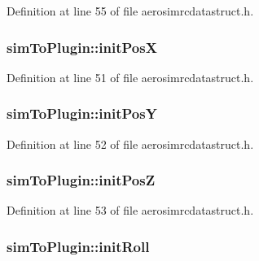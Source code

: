 Definition at line 55 of file aerosimrcdatastruct.\-h.

\hypertarget{group___aero_sim_r_c_ga23ae6e8ef17ad84cc500793e730df894}{
\subsubsection[{init\-Pos\-X}]{ sim\-To\-Plugin\-::init\-Pos\-X}}\label{group___aero_sim_r_c_ga23ae6e8ef17ad84cc500793e730df894}


Definition at line 51 of file aerosimrcdatastruct.\-h.

\hypertarget{group___aero_sim_r_c_gacb4ac6e2ad9d5f215153b9fea05b66bf}{
\subsubsection[{init\-Pos\-Y}]{ sim\-To\-Plugin\-::init\-Pos\-Y}}\label{group___aero_sim_r_c_gacb4ac6e2ad9d5f215153b9fea05b66bf}


Definition at line 52 of file aerosimrcdatastruct.\-h.

\hypertarget{group___aero_sim_r_c_ga020dda7446e3217a8c779458a74feec8}{
\subsubsection[{init\-Pos\-Z}]{ sim\-To\-Plugin\-::init\-Pos\-Z}}\label{group___aero_sim_r_c_ga020dda7446e3217a8c779458a74feec8}


Definition at line 53 of file aerosimrcdatastruct.\-h.

\hypertarget{group___aero_sim_r_c_ga26c1191f08e580c1cdbd02791eabe60e}{
\subsubsection[{init\-Roll}]{ sim\-To\-Plugin\-::init\-Roll}}\label{group___aero_sim_r_c_ga26c1191f08e580c1cdbd02791eabe60e}


